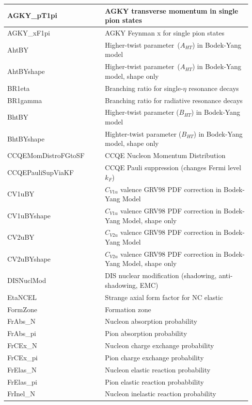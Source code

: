 {\begin{longtable}{|p{0.4\linewidth}|p{0.6\linewidth}|}
   \hline
 AGKY\_pT1pi & AGKY transverse momentum in single pion states \\ \hline
 AGKY\_xF1pi & AGKY Feynman x for single pion states \\ \hline
 AhtBY & Higher-twist parameter ($A_{HT}$) in Bodek-Yang model \\ \hline
 AhtBYshape & Higher-twist parameter ($A_{HT}$) in Bodek-Yang model, shape only \\ \hline
 BR1eta & Branching ratio for single-$\eta$ resonance decays \\ \hline
 BR1gamma & Branching ratio for radiative resonance decays \\ \hline
 BhtBY & Higher-twist parameter ($B_{HT}$) in Bodek-Yang model \\ \hline
 BhtBYshape & Highter-twist parameter ($B_{HT}$) in Bodek-Yang model, shape only \\ \hline
 CCQEMomDistroFGtoSF & CCQE Nucleon Momentum Distribution \\ \hline
 CCQEPauliSupViaKF & CCQE Pauli suppression (changes Fermi level $k_F$) \\ \hline
 CV1uBY & $C_{V1u}$  valence GRV98 PDF correction in Bodek-Yang Model \\ \hline
 CV1uBYshape & $C_{V1u}$  valence GRV98 PDF correction in Bodek-Yang Model, shape only \\ \hline
 CV2uBY & $C_{V2u}$  valence GRV98 PDF correction in Bodek-Yang Model \\ \hline
 CV2uBYshape & $C_{V2u}$  valence GRV98 PDF correction in Bodek-Yang Model, shape only \\ \hline
 DISNuclMod & DIS nuclear modification (shadowing, anti-shadowing, EMC) \\ \hline
 EtaNCEL & Strange axial form factor for NC elastic  \\ \hline
 FormZone & Formation zone \\ \hline
 FrAbs\_N & Nucleon absorption probability \\ \hline
 FrAbs\_pi &Pion absorption probability \\ \hline
 FrCEx\_N & Nucleon charge exchange probability \\ \hline
 FrCEx\_pi & Pion charge exchange probability \\ \hline
 FrElas\_N & Nucleon elastic reaction probability \\ \hline
 FrElas\_pi & Pion elastic reaction probabbility \\ \hline
 FrInel\_N & Nucleon inelastic reaction probability \\ \hline

\end{longtable}}
